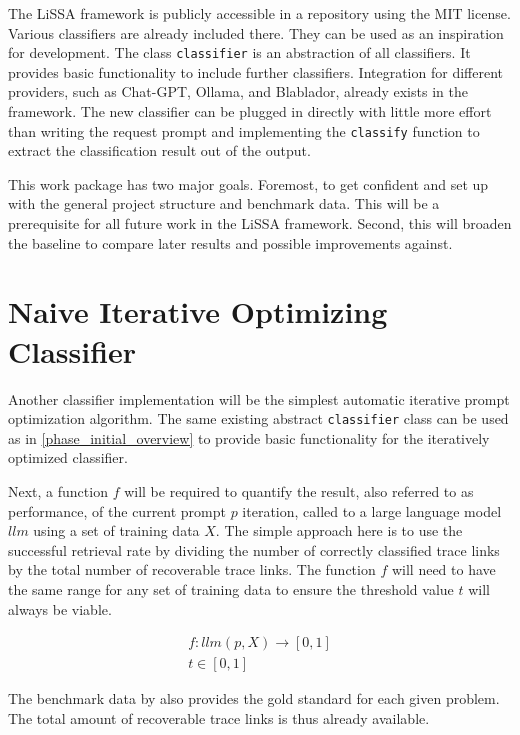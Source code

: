 The LiSSA framework is publicly accessible in a repository using the MIT license. Various classifiers are already included there.
They can be used as an inspiration for development.
The class \verb|classifier| is an abstraction of all classifiers.
It provides basic functionality to include further classifiers.
Integration for different \LLM providers, such as Chat-GPT, Ollama, and Blablador, already exists in the framework.
The new classifier can be plugged in directly with little more effort than writing the request prompt and implementing the \verb|classify| function to extract the classification result out of the \LLM output.

This work package has two major goals.
Foremost, to get confident and set up with the general project structure and benchmark data.
This will be a prerequisite for all future work in the LiSSA framework.
Second, this will broaden the baseline to compare later results and possible improvements against.




\section{Naive Iterative Optimizing Classifier}
\label{approach:sec:naive_iterative}
Another classifier implementation will be the simplest automatic iterative prompt optimization algorithm.
The same existing abstract \verb|classifier| class can be used as in \autoref{phase_initial_overview} to provide basic functionality for the iteratively optimized classifier.

Next, a function $f$ will be required to quantify the result, also referred to as performance, of the current prompt $p$ iteration, called to a large language model $llm$ using a set of training data $X$.
The simple approach here is to use the successful retrieval rate by dividing the number of correctly classified trace links by the total number of recoverable trace links.
The function $f$ will need to have the same range for any set of training data to ensure the threshold value $t$ will always be viable.

\begin{align}
        f: llm(p, X) \rightarrow [0, 1] \\
        t \in [0, 1]
\end{align}

The benchmark data by  also provides the gold standard for each given problem.
The total amount of recoverable trace links is thus already available. 


